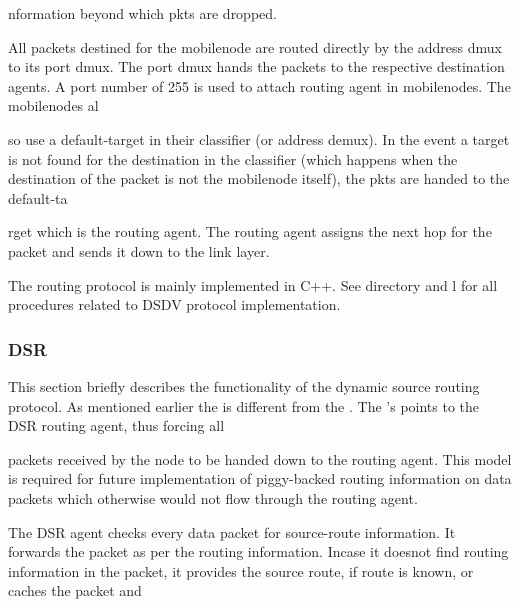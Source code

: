 nformation beyond which pkts are dropped.

All packets destined for the mobilenode are routed directly by the address dmux to its port dmux. The port dmux hands the packets to the respective destination agents. A port number of 255 is used to attach routing agent in mobilenodes. The mobilenodes al









so use a default-target in their classifier (or address demux). In the event a target is not found for the destination in the classifier (which happens when the destination of the packet is not the mobilenode itself), the pkts are handed to the default-ta









rget which is the routing agent. The routing agent assigns the next hop for the packet and sends it down to the link layer.

The routing protocol is mainly implemented in C++. See  directory and l for all procedures related to DSDV protocol implementation.


\subsubsection{DSR}
\label{sec:dsr}

This section briefly describes the functionality of the dynamic source routing protocol. As mentioned earlier the  is different from the .  The 's  points to the DSR routing agent, thus forcing all 









packets received by the node to be handed down to the routing agent. This model is required for future implementation of piggy-backed routing information on data packets which otherwise would not flow through the routing agent.

The DSR agent checks every data packet for source-route information. It forwards the packet as per the routing information. Incase it doesnot find routing information in the packet, it provides the source route, if route is known, or caches the packet and









